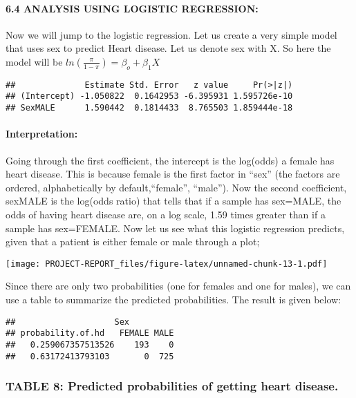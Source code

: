 \documentclass[
]{article}
\begin{document}
\hypertarget{analysis-using-logistic-regression}{%
\paragraph{6.4 ANALYSIS USING LOGISTIC
REGRESSION:}\label{analysis-using-logistic-regression}}

Now we will jump to the logistic regression. Let us create a very simple
model that uses sex to predict Heart disease. Let us denote sex with X.
So here the model will be \(ln(\frac{\pi}{1-\pi})=\beta_o+\beta_1X\)

\begin{verbatim}
##              Estimate Std. Error   z value     Pr(>|z|)
## (Intercept) -1.050822  0.1642953 -6.395931 1.595726e-10
## SexMALE      1.590442  0.1814433  8.765503 1.859444e-18
\end{verbatim}

\hypertarget{interpretation}{%
\paragraph{Interpretation:}\label{interpretation}}

Going through the first coefficient, the intercept is the log(odds) a
female has heart disease. This is because female is the first factor in
``sex'' (the factors are ordered, alphabetically by default,``female'',
``male''). Now the second coefficient, sexMALE is the log(odds ratio)
that tells that if a sample has sex=MALE, the odds of having heart
disease are, on a log scale, 1.59 times greater than if a sample has
sex=FEMALE. Now let us see what this logistic regression predicts, given
that a patient is either female or male through a plot;

\texttt{[image: PROJECT-REPORT\_files/figure-latex/unnamed-chunk-13-1.pdf]}

Since there are only two probabilities (one for females and one for
males), we can use a table to summarize the predicted probabilities. The
result is given below:

\begin{verbatim}
##                    Sex
## probability.of.hd   FEMALE MALE
##   0.259067357513526    193    0
##   0.63172413793103       0  725
\end{verbatim}

\hypertarget{table-8-predicted-probabilities-of-getting-heart-disease.}{%
\subsubsection{TABLE 8: Predicted probabilities of getting heart
disease.}\label{table-8-predicted-probabilities-of-getting-heart-disease.}}
\end{document}
